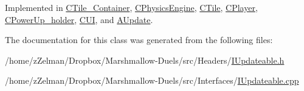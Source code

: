 Implemented in \hyperlink{classCTile__Container_abe6e19de544f042671094697bb83fde9}{C\-Tile\-\_\-\-Container}, \hyperlink{classCPhysicsEngine_abc493897bbdb15e6787a25478730f1f5}{C\-Physics\-Engine}, \hyperlink{classCTile_a818a17e48a7219eedac950b82c641ee0}{C\-Tile}, \hyperlink{classCPlayer_aa77025c046956b109a76d53c12a80fa5}{C\-Player}, \hyperlink{classCPowerUp__holder_a328fb121f8134feaa10db9db7bd3838b}{C\-Power\-Up\-\_\-holder}, \hyperlink{classCUI_ab0b322040b41a6650bd625216f77b75c}{C\-U\-I}, and \hyperlink{classAUpdate_a9f5be387e467fc5eea7fc45882abd949}{A\-Update}.



The documentation for this class was generated from the following files\-:\begin{DoxyCompactItemize}
\item 
/home/z\-Zelman/\-Dropbox/\-Marshmallow-\/\-Duels/src/\-Headers/\hyperlink{IUpdateable_8h}{I\-Updateable.\-h}\item 
/home/z\-Zelman/\-Dropbox/\-Marshmallow-\/\-Duels/src/\-Interfaces/\hyperlink{IUpdateable_8cpp}{I\-Updateable.\-cpp}\end{DoxyCompactItemize}
